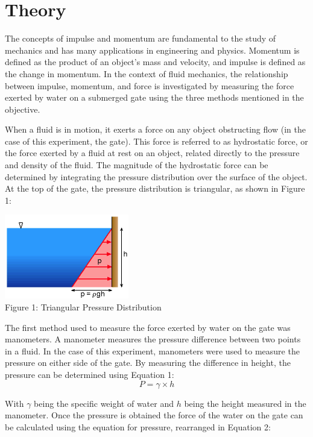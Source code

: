 \documentclass{article}
\begin{document}
\newpage
\section{Theory}
\par The concepts of impulse and momentum are fundamental to the study of mechanics and has many applications in engineering and physics. Momentum is defined as the product of an object's mass and velocity, and impulse is defined as the change in momentum. In the context of fluid mechanics, the relationship between impulse, momentum, and force is investigated by measuring the force exerted by water on a submerged gate using the three methods mentioned in the objective.
\par When a fluid is in motion, it exerts a force on any object obstructing flow (in the case of this experiment, the gate). This force is referred to as hydrostatic force, or the force exerted by a fluid at rest on an object, related directly to the pressure and density of the fluid. The magnitude of the hydrostatic force can be determined by integrating the pressure distribution over the surface of the object. At the top of the gate, the pressure distribution is triangular, as shown in Figure 1: 
\begin{center}
\includegraphics*{fig1.png}
\\Figure 1: Triangular Pressure Distribution 
\end{center}
\par The first method used to measure the force exerted by water on the gate was manometers. A manometer measures the pressure difference between two points in a fluid. In the case of this experiment, manometers were used to measure the pressure on either side of the gate. By measuring the difference in height, the pressure can be determined using Equation 1: 
\begin{equation}
    P=\gamma\times h
\end{equation}
\par With $\gamma$ being the specific weight of water and $h$ being the height measured in the manometer. Once the pressure is obtained the force of the water on the gate can be calculated using the equation for pressure, rearranged in Equation 2: 
\end{document}
